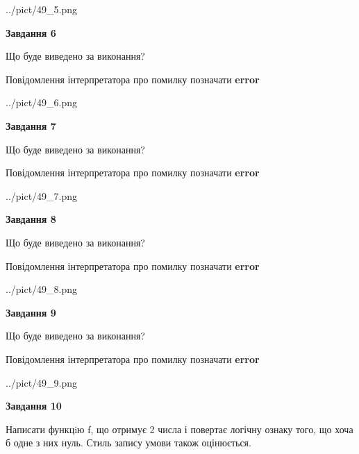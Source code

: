 \documentclass[12pt, ukrainian]{article}
\begin{document}
{\begin {large}
\begin{center}
	{../pict/49_5.png}
\end{center}
\newpage

{\begin {center}\textbf{Завдання 6}\end {center}}\par
Що буде виведено за виконання? \par
Повідомлення інтерпретатора про помилку позначати \textbf{error}

\begin{center}
	{../pict/49_6.png}
\end{center}
\newpage

{\begin {center}\textbf{Завдання 7}\end {center}}\par
Що буде виведено за виконання? \par
Повідомлення інтерпретатора про помилку позначати \textbf{error}

\begin{center}
	{../pict/49_7.png}
\end{center}
\newpage

{\begin {center}\textbf{Завдання 8}\end {center}}\par
Що буде виведено за виконання? \par
Повідомлення інтерпретатора про помилку позначати \textbf{error}

\begin{center}
	{../pict/49_8.png}
\end{center}
\newpage

{\begin {center}\textbf{Завдання 9}\end {center}}\par
Що буде виведено за виконання? \par
Повідомлення інтерпретатора про помилку позначати \textbf{error}

\begin{center}
	{../pict/49_9.png}
\end{center}
\newpage

{\begin {center}\textbf{Завдання 10}\end {center}}\par

Написати функцiю f, що отримує 2 числа і повертає логічну ознаку того, що хоча б одне з них нуль. Стиль запису умови також оцінюється.\par
\newpage

\end {large}}
\end{document}
